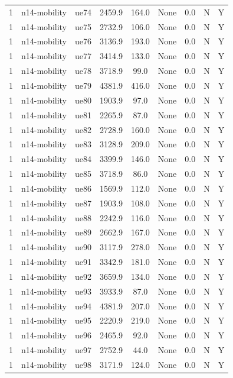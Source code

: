 \begin{table}[ht]
\begin{tabular}{|c|c|c|c|c|c|c|c|c|}
1 & n14-mobility & ue74 & 2459.9 & 164.0 & None & 0.0 & N & Y \\
1 & n14-mobility & ue75 & 2732.9 & 106.0 & None & 0.0 & N & Y \\
1 & n14-mobility & ue76 & 3136.9 & 193.0 & None & 0.0 & N & Y \\
1 & n14-mobility & ue77 & 3414.9 & 133.0 & None & 0.0 & N & Y \\
1 & n14-mobility & ue78 & 3718.9 & 99.0 & None & 0.0 & N & Y \\
1 & n14-mobility & ue79 & 4381.9 & 416.0 & None & 0.0 & N & Y \\
1 & n14-mobility & ue80 & 1903.9 & 97.0 & None & 0.0 & N & Y \\
1 & n14-mobility & ue81 & 2265.9 & 87.0 & None & 0.0 & N & Y \\
1 & n14-mobility & ue82 & 2728.9 & 160.0 & None & 0.0 & N & Y \\
1 & n14-mobility & ue83 & 3128.9 & 209.0 & None & 0.0 & N & Y \\
1 & n14-mobility & ue84 & 3399.9 & 146.0 & None & 0.0 & N & Y \\
1 & n14-mobility & ue85 & 3718.9 & 86.0 & None & 0.0 & N & Y \\
1 & n14-mobility & ue86 & 1569.9 & 112.0 & None & 0.0 & N & Y \\
1 & n14-mobility & ue87 & 1903.9 & 108.0 & None & 0.0 & N & Y \\
1 & n14-mobility & ue88 & 2242.9 & 116.0 & None & 0.0 & N & Y \\
1 & n14-mobility & ue89 & 2662.9 & 167.0 & None & 0.0 & N & Y \\
1 & n14-mobility & ue90 & 3117.9 & 278.0 & None & 0.0 & N & Y \\
1 & n14-mobility & ue91 & 3342.9 & 181.0 & None & 0.0 & N & Y \\
1 & n14-mobility & ue92 & 3659.9 & 134.0 & None & 0.0 & N & Y \\
1 & n14-mobility & ue93 & 3933.9 & 87.0 & None & 0.0 & N & Y \\
1 & n14-mobility & ue94 & 4381.9 & 207.0 & None & 0.0 & N & Y \\
1 & n14-mobility & ue95 & 2220.9 & 219.0 & None & 0.0 & N & Y \\
1 & n14-mobility & ue96 & 2465.9 & 92.0 & None & 0.0 & N & Y \\
1 & n14-mobility & ue97 & 2752.9 & 44.0 & None & 0.0 & N & Y \\
1 & n14-mobility & ue98 & 3171.9 & 124.0 & None & 0.0 & N & Y \\

\end{tabular}
\end{table}
